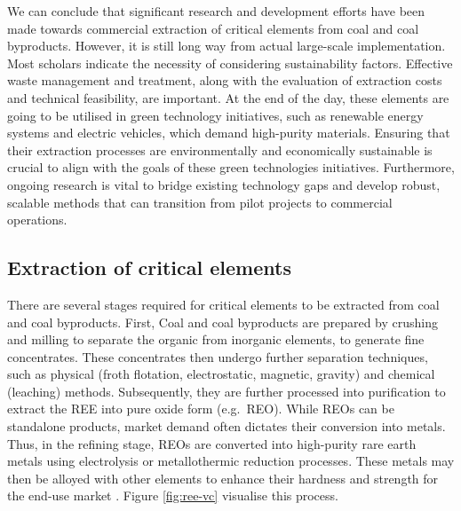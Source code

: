 \documentclass[11pt,a4paper,]{article}
\begin{document}
We can conclude that significant research and development efforts have been made towards commercial extraction of critical elements from coal and coal byproducts. However, it is still long way from actual large-scale implementation. Most scholars indicate the necessity of considering sustainability factors. Effective waste management and treatment, along with the evaluation of extraction costs and technical feasibility, are important. At the end of the day, these elements are going to be utilised in green technology initiatives, such as renewable energy systems and electric vehicles, which demand high-purity materials. Ensuring that their extraction processes are environmentally and economically sustainable is crucial to align with the goals of these green technologies initiatives. Furthermore, ongoing research is vital to bridge existing technology gaps and develop robust, scalable methods that can transition from pilot projects to commercial operations.

\subsection{Extraction of critical elements}\label{extraction-of-critical-elements}

There are several stages required for critical elements to be extracted from coal and coal byproducts. First, Coal and coal byproducts are prepared by crushing and milling to separate the organic from inorganic elements, to generate fine concentrates. These concentrates then undergo further separation techniques, such as physical (froth flotation, electrostatic, magnetic, gravity) and chemical (leaching) methods. Subsequently, they are further processed into purification to extract the REE into pure oxide form (e.g.~REO). While REOs can be standalone products, market demand often dictates their conversion into metals. Thus, in the refining stage, REOs are converted into high-purity rare earth metals using electrolysis or metallothermic reduction processes. These metals may then be alloyed with other elements to enhance their hardness and strength for the end-use market \autocite{Eterigho2021,usde2017,TALAN2022107897}. Figure \ref{fig:ree-vc} visualise this process.
\end{document}
